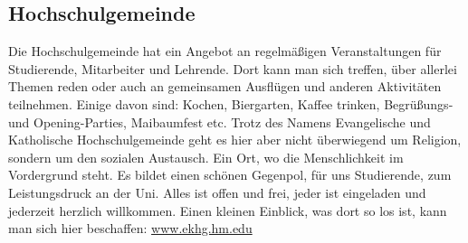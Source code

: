 \subsection{Hochschulgemeinde}
Die Hochschulgemeinde hat ein Angebot an regelmäßigen 
Veranstaltungen für Studierende, Mitarbeiter und Lehrende. Dort kann 
man sich treffen, über allerlei Themen reden oder auch an gemeinsamen 
Ausflügen und anderen Aktivitäten teilnehmen. Einige davon sind: 
Kochen, Biergarten, Kaffee trinken, Begrüßungs- und Opening-Parties, 
Maibaumfest etc. \doublebreak
Trotz des Namens \glqq Evangelische und Katholische Hochschulgemeinde\grqq{} 
geht es hier aber nicht überwiegend um Religion, sondern um den 
sozialen Austausch. Ein Ort, wo die Menschlichkeit im Vordergrund 
steht. Es bildet einen schönen Gegenpol, für uns Studierende, zum 
Leistungsdruck an der Uni. \doublebreak
Alles ist offen und frei, jeder ist eingeladen und jederzeit herzlich 
willkommen. \doublebreak
Einen kleinen Einblick, was dort so los ist, kann man sich hier beschaffen: 
\url{www.ekhg.hm.edu} 